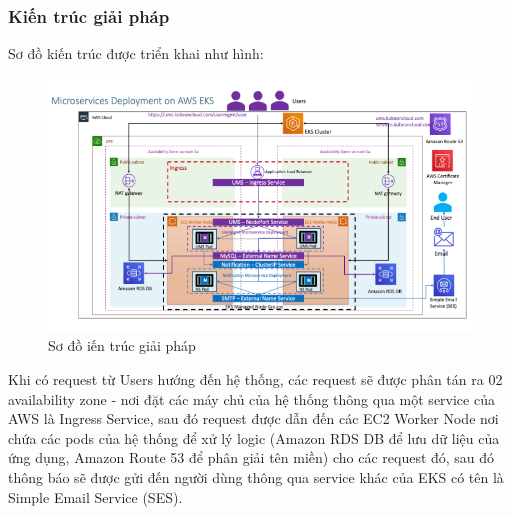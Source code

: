 \subsubsection{Kiến trúc giải pháp}
Sơ đồ kiến trúc được triển khai như hình:
\begin{figure}[H]
    \begin{center}
    \includegraphics[scale=0.8]{images/hieu/chap-2/solution-architecture.png}
    \vspace*{5mm}
    \caption{Sơ đồ iến trúc giải pháp}
    \end{center}
\end{figure}    
Khi có request từ Users hướng đến hệ thống, các request sẽ được phân tán ra 02 availability zone - nơi đặt các máy chủ của hệ thống thông qua một service của AWS là Ingress Service, sau đó request được dẫn đến các EC2 Worker Node nơi chứa các pods của hệ thống để xử lý logic (Amazon RDS DB để lưu dữ liệu của ứng dụng, Amazon Route 53 để phân giải tên miền) cho các request đó, sau đó thông báo sẽ được gửi đến người dùng thông qua service khác của EKS có tên là Simple Email Service (SES).